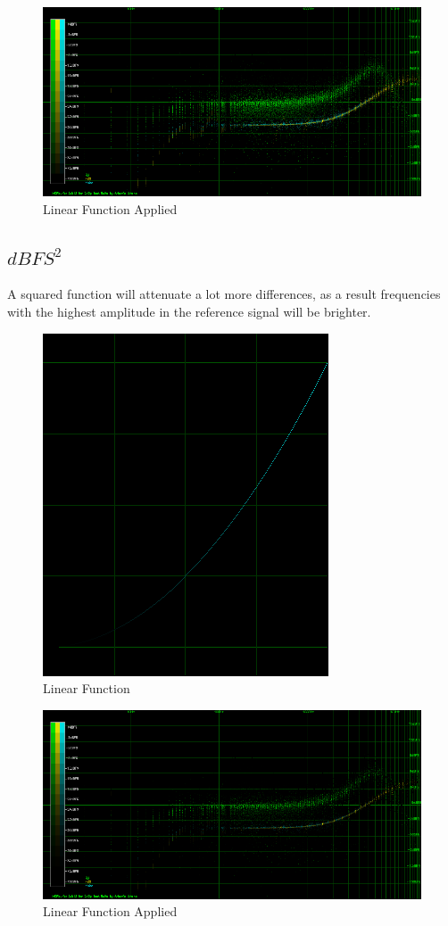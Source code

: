\documentclass[10pt,a4paper]{report}
\begin{document}
\begin{figure}[H]
	\centering
	\includegraphics[width=1\linewidth]{plots/BetaFunctionPlot_3_Data}
	\caption[Linear Applied]{Linear Function Applied}
	\label{fig:betafunctionplot3data}
\end{figure}

\newpage
\subsection{$dBFS^2$}

A squared function will attenuate a lot more differences, as a result frequencies with the highest amplitude in the reference signal will be brighter.

\begin{figure}[H]
	\centering
	\includegraphics[width=0.4\linewidth]{plots/BetaFunctionPlot_4}
	\caption[Linear]{Linear Function}
	\label{fig:betafunctionplot4}
\end{figure}

\begin{figure}[H]
	\centering
	\includegraphics[width=1\linewidth]{plots/BetaFunctionPlot_4_Data}
	\caption[Linear Applied]{Linear Function Applied}
	\label{fig:betafunctionplot4data}
\end{figure}
\end{document}
